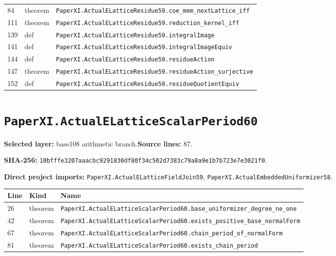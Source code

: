 \documentclass[10pt,oneside]{book}
\begin{document}
\begin{longtable}{@{}p{}p{}p{}@{}}
84&theorem&\nolinkurl{PaperXI.ActualELatticeResidue59.coe_mem_nextLattice_iff}\\

111&theorem&\nolinkurl{PaperXI.ActualELatticeResidue59.reduction_kernel_iff}\\

139&def&\nolinkurl{PaperXI.ActualELatticeResidue59.integralImage}\\

141&def&\nolinkurl{PaperXI.ActualELatticeResidue59.integralImageEquiv}\\

144&def&\nolinkurl{PaperXI.ActualELatticeResidue59.residueAction}\\

147&theorem&\nolinkurl{PaperXI.ActualELatticeResidue59.residueAction_surjective}\\

152&def&\nolinkurl{PaperXI.ActualELatticeResidue59.residueQuotientEquiv}\\

\bottomrule\end{longtable}

\section{\texorpdfstring{\nolinkurl{PaperXI.ActualELatticeScalarPeriod60}}{PaperXI.ActualELatticeScalarPeriod60}}\label{module:PaperXI.ActualELatticeScalarPeriod60}

\textbf{Selected layer:} base108 arithmetic branch.\quad\textbf{Source lines:} 87.\par\textbf{SHA-256:} {\scriptsize\nolinkurl{10bfffe3207aaacbc9291830df80f34c502d7383c79a8a9e1b7b723e7e3021f0}}.


\textbf{Direct project imports:} \nolinkurl{PaperXI.ActualELatticeFieldJoin59}, \nolinkurl{PaperXI.ActualEmbeddedUniformizer58}.

\begin{longtable}{@{}p{}p{}p{}@{}}\toprule Line&Kind&Name\\\midrule\endhead

26&theorem&\nolinkurl{PaperXI.ActualELatticeScalarPeriod60.base_uniformizer_degree_ne_one}\\

42&theorem&\nolinkurl{PaperXI.ActualELatticeScalarPeriod60.exists_positive_base_normalForm}\\

67&theorem&\nolinkurl{PaperXI.ActualELatticeScalarPeriod60.chain_period_of_normalForm}\\

81&theorem&\nolinkurl{PaperXI.ActualELatticeScalarPeriod60.exists_chain_period}\\

\bottomrule\end{longtable}
\end{document}
